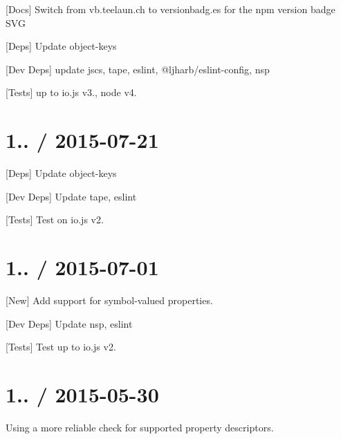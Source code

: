 
\begin{DoxyItemize}
\item \mbox{[}Docs\mbox{]} Switch from vb.\+teelaun.\+ch to versionbadg.\+es for the npm version badge S\+VG
\item \mbox{[}Deps\mbox{]} Update {\ttfamily object-\/keys}
\item \mbox{[}Dev Deps\mbox{]} update {\ttfamily jscs}, {\ttfamily tape}, {\ttfamily eslint}, {\ttfamily @ljharb/eslint-\/config}, {\ttfamily nsp}
\item \mbox{[}Tests\mbox{]} up to {\ttfamily io.\+js} {\ttfamily v3.}, {\ttfamily node} {\ttfamily v4.}
\end{DoxyItemize}

\section*{1.. / 2015-\/07-\/21 }


\begin{DoxyItemize}
\item \mbox{[}Deps\mbox{]} Update {\ttfamily object-\/keys}
\item \mbox{[}Dev Deps\mbox{]} Update {\ttfamily tape}, {\ttfamily eslint}
\item \mbox{[}Tests\mbox{]} Test on {\ttfamily io.\+js} {\ttfamily v2.}
\end{DoxyItemize}

\section*{1.. / 2015-\/07-\/01 }


\begin{DoxyItemize}
\item \mbox{[}New\mbox{]} Add support for symbol-\/valued properties.
\item \mbox{[}Dev Deps\mbox{]} Update {\ttfamily nsp}, {\ttfamily eslint}
\item \mbox{[}Tests\mbox{]} Test up to {\ttfamily io.\+js} {\ttfamily v2.}
\end{DoxyItemize}

\section*{1.. / 2015-\/05-\/30 }


\begin{DoxyItemize}
\item Using a more reliable check for supported property descriptors.
\end{DoxyItemize}

